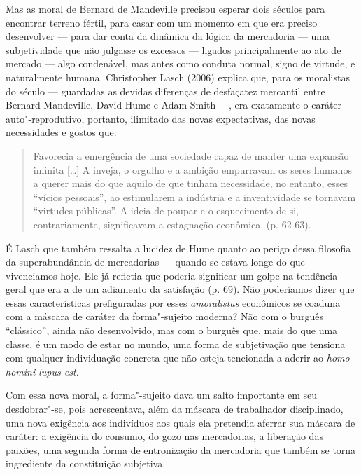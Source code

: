 {Mas as moral de Bernard de Mandeville precisou esperar dois séculos para
encontrar terreno fértil, para casar com um momento em que era preciso
desenvolver --- para dar conta da dinâmica da lógica da mercadoria ---
uma subjetividade que não julgasse os excessos --- ligados
principalmente ao ato de mercado --- algo condenável, mas antes como
conduta normal, signo de virtude, e naturalmente humana. Christopher
Lasch (2006) explica que, para os moralistas do século  ---
guardadas as devidas diferenças de desfaçatez mercantil entre Bernard
Mandeville, David Hume e Adam Smith ---, era exatamente o caráter
auto"-reprodutivo, portanto, ilimitado das novas expectativas, das novas
necessidades e gostos que:

\begin{quote}
Favorecia a emergência de uma sociedade capaz de manter uma expansão
infinita [\ldots{}] A inveja, o orgulho e a ambição empurravam os seres
humanos a querer mais do que aquilo de que tinham necessidade, no
entanto, esses ``vícios pessoais'', ao estimularem a indústria e a
inventividade se tornavam ``virtudes públicas''. A ideia de poupar e o
esquecimento de si, contrariamente, significavam a estagnação econômica.
(p. 62-63).
\end{quote}

É Lasch que também ressalta a lucidez de Hume quanto ao perigo dessa
filosofia da superabundância de mercadorias --- quando se estava longe
do que vivenciamos hoje. Ele já refletia que poderia significar um golpe
na tendência geral que era a de um adiamento da satisfação (p. 69). Não
poderíamos dizer que essas características prefiguradas por esses
\emph{amoralistas} econômicos se coaduna com a máscara de caráter da
forma"-sujeito moderna? Não com o burguês ``clássico'', ainda não
desenvolvido, mas com o burguês que, mais do que uma classe, é um modo
de estar no mundo, uma forma de subjetivação que tensiona com qualquer
individuação concreta que não esteja tencionada a aderir ao \emph{homo
homini lupus est.}

Com essa nova moral, a forma"-sujeito dava um salto importante em seu
desdobrar"-se, pois acrescentava, além da máscara de trabalhador
disciplinado, uma nova exigência aos indivíduos aos quais ela pretendia
aferrar sua máscara de caráter: a exigência do consumo, do gozo nas
mercadorias, a liberação das paixões, uma segunda forma de entronização
da mercadoria que também se torna ingrediente da constituição subjetiva.

}
